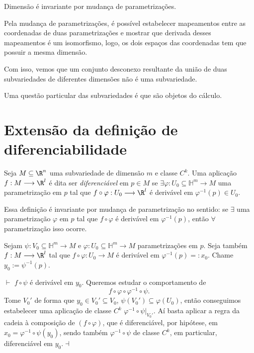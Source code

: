 
\begin{remark}
        Dimensão é invariante por mudança de parametrizações.

	Pela mudança de parametrizações, é possível estabelecer mapeamentos entre as coordenadas de duas parametrizações e mostrar que derivada desses mapeamentos é um isomorfismo, logo, os dois espaços das coordenadas tem que possuir a mesma dimensão.

	Com isso, vemos que um conjunto desconexo resultante da união de duas subvariedades de diferentes dimensões não é uma subvariedade.
\end{remark}

Uma questão particular das subvariedades é que são objetos do cálculo.

\section*{Extensão da definição de diferenciabilidade}

\begin{definition}
    Seja $M\subseteq\R^{n}$ uma subvariedade de dimensão $m$ e classe $C^{k}$. Uma aplicação $f: M \longrightarrow \R^{l}$ é dita ser \emph{diferenciável} em $p \in M$ se $\exists \varphi : U_0\subseteq\mathbb{H}^{m} \longrightarrow M$ uma parametrização em $p$ tal que $f\circ \varphi : U_0 \longrightarrow \R^{l}$ é derivável em $\varphi ^{-1}\left( p \right) \in U_0$.
\end{definition}

\begin{remark}
    Essa definição é invariante por mudança de parametrização no sentido: se $\exists $ uma parametrização $\varphi $ em $p$ tal que $f\circ \varphi $ é derivável em $\varphi ^{-1}\left( p \right) $, então $\forall $ parametrização isso ocorre.

    Sejam $\psi : V_0\subseteq\mathbb{H}^{m} \longrightarrow M$ e $\varphi : U_0\subseteq\mathbb{H}^{m} \longrightarrow M$ parametrizações em $p$. Seja também $f: M \longrightarrow \R^{l}$ tal que $f\circ \varphi : U_0 \longrightarrow M$ é derivável em $\varphi ^{-1}\left( p \right) =: x_0$. Chame $y_0:=\psi^{-1}\left( p \right) $.

    $\vdash$ $f\circ \psi$ é derivável em $y_0$. Queremos estudar o comportamento de \[
    f\circ \varphi \circ \varphi ^{-1}\circ \psi
    .\] Tome $V_0'$ de forma que $y_0\in V_0' \subseteq V_0$, $\psi\left( V_0' \right) \subseteq\varphi \left( U_0 \right) $, então conseguimos estabelecer uma aplicação de classe $C^{k}$ $\varphi ^{-1}\circ \psi \Big|_{V_0'}$. Aí basta aplicar a regra da cadeia à composição de $\left( f \circ \varphi  \right) $, que é diferenciável, por hipótese, em $x_0 = \varphi ^{-1}\circ \psi\left( y_0 \right) $, sendo também $\varphi ^{-1}\circ \psi$ de classe $C^{k}$, em particular, diferenciável em $y_0$.$\dashv$
\end{remark}

